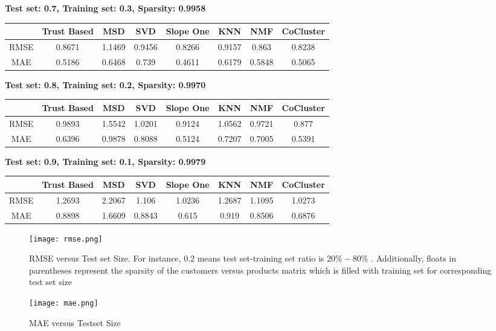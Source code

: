 \vspace{1cm}
\textbf{Test set: 0.7, Training set: 0.3, Sparsity: 0.9958}
\begin{center}
	\begin{tabular}{ | c | c | c | c | c | c | c | c |}
		\hline
		& Trust Based & MSD & SVD & Slope One & KNN & NMF & CoCluster\\ 
		\hline
		RMSE&0.8671  & 1.1469  & 0.9456  & 0.8266  & 0.9157  & 0.863  & 0.8238\\
		\hline
		MAE&0.5186  & 0.6468  & 0.739  & 0.4611  & 0.6179  & 0.5848  & 0.5065\\
		\hline
	\end{tabular}
\end{center} 
\vspace{1cm}
\textbf{Test set: 0.8, Training set: 0.2, Sparsity: 0.9970}
\begin{center}
	\begin{tabular}{ | c | c | c | c | c | c | c | c |}
		\hline
		& Trust Based & MSD & SVD & Slope One & KNN & NMF & CoCluster\\ 
		\hline
		RMSE&0.9893  & 1.5542  & 1.0201  & 0.9124  & 1.0562  & 0.9721  & 0.877\\
		\hline
		MAE&0.6396  & 0.9878  & 0.8088  & 0.5124  & 0.7207  & 0.7005  & 0.5391\\
		\hline
	\end{tabular}
\end{center} 
\vspace{1cm}
\textbf{Test set: 0.9, Training set: 0.1, Sparsity: 0.9979}
\begin{center}
	\begin{tabular}{ | c | c | c | c | c | c | c | c |}
		\hline
		& Trust Based & MSD & SVD & Slope One & KNN & NMF & CoCluster\\ 
		\hline
		RMSE&1.2693  & 2.2067  & 1.106  & 1.0236  & 1.2687  & 1.1095  & 1.0273\\
		\hline
		MAE&0.8898  & 1.6609  & 0.8843  & 0.615  & 0.919  & 0.8506  & 0.6876\\
		\hline
	\end{tabular}
\end{center} 

\begin{figure}[H]
	\centering
	\texttt{[image: rmse.png]}
	\vspace{-0.5cm}
	\caption{RMSE versus Test set Size. For instance, 0.2 means test set-training set ratio is $20\%-80\%$ . Additionally, floats in parentheses represent the sparsity of the customers versus products matrix which is filled with training set for corresponding test set size}
	\label{fig:rmse}
\end{figure}

\begin{figure}[H]
	\centering
	\texttt{[image: mae.png]}
	\vspace{-0.5cm}
	\caption{MAE versus Testset Size}
	\label{fig:mae}
\end{figure}